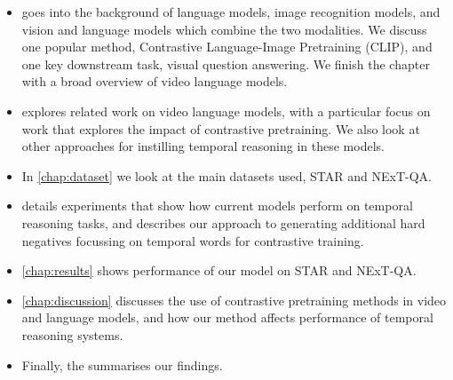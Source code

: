 \begin{itemize}
	\item {} goes into the background of language models,
		image recognition models, and vision and language models which combine
		the two modalities. We discuss one popular method, Contrastive
		Language-Image Pretraining (CLIP), and one key downstream task, visual
		question answering. We finish the chapter with a broad overview of video
		language models.
	\item {} explores related work on video language models,
		with a particular focus on work that explores the impact of contrastive
		pretraining. We also look at other approaches for instilling temporal
		reasoning in these models.
	\item In \cref{chap:dataset} we look at the main datasets used, STAR and NExT-QA.
	\item {} details experiments that show how current
		models perform on temporal reasoning tasks, and describes our approach
		to generating additional hard negatives focussing on temporal words for
		contrastive training.
	\item \cref{chap:results} shows performance of our model on STAR and NExT-QA.
	\item \cref{chap:discussion} discusses the use of contrastive
		pretraining methods in video and language models, and how our method
		affects performance of temporal reasoning systems.
	\item Finally, the  summarises our findings.
\end{itemize}
